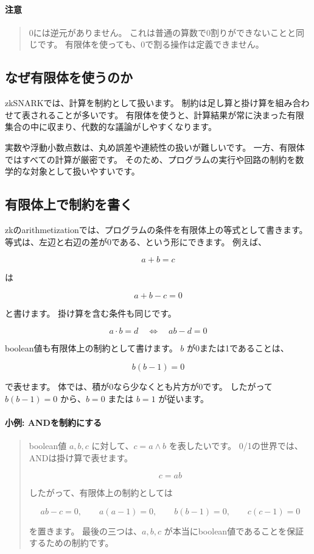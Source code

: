\documentclass[a4paper,11pt]{ltjsarticle}
\newenvironment{examplebox}[1]{%
  \paragraph*{#1}\begin{quote}
}{%
  \end{quote}
}
\newenvironment{warnbox}{%
  \paragraph*{注意}\begin{quote}
}{%
  \end{quote}
}
\begin{document}
\begin{warnbox}
0には逆元がありません。
これは普通の算数で0割りができないことと同じです。
有限体を使っても、0で割る操作は定義できません。
\end{warnbox}

\subsection{なぜ有限体を使うのか}

zkSNARKでは、計算を制約として扱います。
制約は足し算と掛け算を組み合わせて表されることが多いです。
有限体を使うと、計算結果が常に決まった有限集合の中に収まり、代数的な議論がしやすくなります。

実数や浮動小数点数は、丸め誤差や連続性の扱いが難しいです。
一方、有限体ではすべての計算が厳密です。
そのため、プログラムの実行や回路の制約を数学的な対象として扱いやすいです。

\subsection{有限体上で制約を書く}

zkのarithmetizationでは、プログラムの条件を有限体上の等式として書きます。
等式は、左辺と右辺の差が0である、という形にできます。
例えば、

\[
  a+b=c
\]

は

\[
  a+b-c=0
\]

と書けます。
掛け算を含む条件も同じです。

\[
  a\cdot b=d
  \quad \Longleftrightarrow \quad
  a b - d = 0
\]

boolean値も有限体上の制約として書けます。
\(b\) が0または1であることは、

\[
  b(b-1)=0
\]

で表せます。
体では、積が0なら少なくとも片方が0です。
したがって \(b(b-1)=0\) から、\(b=0\) または \(b=1\) が従います。

\begin{examplebox}{小例: ANDを制約にする}
boolean値 \(a,b,c\) に対して、\(c=a \land b\) を表したいです。
0/1の世界では、ANDは掛け算で表せます。

\[
  c = a b
\]

したがって、有限体上の制約としては

\[
  ab-c=0,\qquad a(a-1)=0,\qquad b(b-1)=0,\qquad c(c-1)=0
\]

を置きます。
最後の三つは、\(a,b,c\) が本当にboolean値であることを保証するための制約です。
\end{examplebox}
\end{document}

